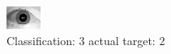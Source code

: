 \begin{figure}[h!]
\begin{center}
\includegraphics[width=0.60\columnwidth]{figures/ID1746_class_3_target_2.png}
\end{center}
\caption{ Classification: 3 actual target: 2}
\label{fig:ID1746_class_3_target_2}
\end{figure}
